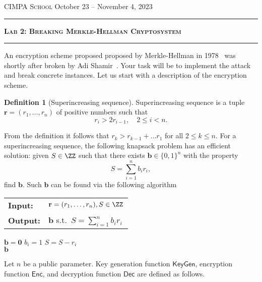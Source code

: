\documentclass[11pt]{exam}
\theoremstyle{definition}
\newtheorem{definition}[theorem]{Definition}
\let\vec\mathbf
\begin{document}
	{\noindent
		\textsc{CIMPA School}
		\hfill {October 23 -- November 4, 2023\\}
	\hrule
	\begin{center}
		{\Large\textbf{
				\textsc{Lab 2: Breaking Merkle-Hellman Cryptosystem} \\[5pt]
		} } 
	\end{center}
	}
	\hrule \vspace{5mm}
	
	\thispagestyle{empty}
	
	\vspace{0.2cm}
	

An encryption scheme proposed proposed by Merkle-Hellman in 1978~\cite{MH78} was shortly after broken by Adi Shamir~\cite{Shamir}.
Your task will be to implement the attack and break concrete instances. Let us start with a description of the encryption scheme.

\begin{definition}[Superincreasing sequence]
	Superincreasing sequence is a tuple $\vec{r} = (r_1, \ldots, r_n)$ of positive numbers such that
	\[
	r_i > 2r_{i-1}, \quad 2\leq i < n.
	\] 
\end{definition}

From the definition it follows that $r_k > r_{k-1} + \ldots r_1$ for all $2 \leq k \leq n$. For a superincreasing sequence, the following knapsack problem has an efficient solution: given $S \in \ZZ$ such that there exists $\vec b \in \{0,1\}^n$ with the property
\[
	S = \sum_{i=1}^n b_i r_i,
\]
find $\vec b$. Such $\vec b$ can be found via the following algorithm
\begin{algorithm}[H] \caption{Superincreasing knapsack}
	\begin{tabular}{l l}
		\textbf{Input:} 
		& $\vec{r} = (r_1, \ldots, r_n), S \in \ZZ$ \\
		\textbf{Output:} 
		& $\vec b$ s.t.\ $S = \sum_{i=1}^n b_i r_i$ \\
\end{tabular}
	\begin{algorithmic}[1]
		\State $\vec b = \vec 0$
				\State $b_i = 1$
				\State $S = S-r_i$
			\EndIf
		\EndFor \\
		\Return $\vec b$
	\end{algorithmic}
\label{alg:knapsack_superenc}
\caption{Solving superincreasing knapsack}
\end{algorithm}

Let $n$ be a public parameter. Key generation function $\mathsf{KeyGen}$, encryption function  $\mathsf{Enc}$, and decryption function $ \mathsf{Dec}$ are defined as follows.
\end{document}
